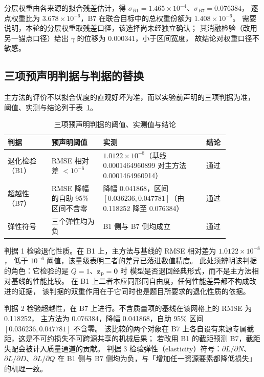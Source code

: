 分层权重由各来源的拟合残差估计，得 $\sigma_{B1}=1.465\times10^{-4}$、$\sigma_{B7}=0.076384$，
逐点权重比为 $3.678\times10^{-6}$，B7 在联合目标中的总权重份额为 $1.408\times10^{-6}$。
需要说明，本轮的分层权重取残差口径，该选择尚未经独立确认；
其消融检验（改用另一锚点口径）给出 $\gamma$ 的位移为 0.000341，小于区间宽度，
故结论对权重口径不敏感。

\subsection{三项预声明判据与判据的替换}
\label{subsec:q2-criteria}

主方法的评价不以拟合优度的直观好坏为准，而以实验前声明的三项判据为准，
阈值、实测与结论列于表~\ref{tab:q2-criteria}。

\begin{table}[H]
  \centering
  \caption{三项预声明判据的阈值、实测值与结论}
  \label{tab:q2-criteria}
  \begin{tabular}{@{}>{\raggedright\arraybackslash}p{0.17\linewidth}>{\raggedright\arraybackslash}p{0.20\linewidth}>{\raggedright\arraybackslash}p{0.40\linewidth}>{\raggedright\arraybackslash}p{0.09\linewidth}@{}}
    \toprule
    判据 & 预声明阈值 & 实测 & 结论 \\
    \midrule
    1 退化检验（B1） & RMSE 相对差 $<10^{-6}$ &
      $1.0122\times10^{-8}$（基线 0.0001464960899 对主方法 0.0001464960914） & 通过 \\
    2 超越性（B7） & RMSE 降幅的自助 95\% 区间不含零 &
      降幅 0.041868，区间 $[0.036236,0.047781]$（由 0.118252 降至 0.076384） & 通过 \\
    3 弹性符号 & 三个弹性均为负 & B1 侧与 B7 侧均成立 & 通过 \\
    \bottomrule
  \end{tabular}
\end{table}

判据 1 检验退化性质。在 B1 上，主方法与基线的 RMSE 相对差为 $1.0122\times10^{-8}$，
低于 $10^{-6}$ 阈值，该量级表明二者的差异已落进数值精度。
此处须辨明该判据的角色：它检验的是 $Q=1$、$\boldsymbol{z}_{\boldsymbol{p}}=\boldsymbol{0}$ 时
模型是否退回经典形式，而不是主方法相对基线的性能比较。
在 B1 上二者本应同形同自由度，任何性能差异都不构成改进的证据，
该判据的双重作用在于它同时也是题目所要求的退化性质的依据。

判据 2 检验超越性，在 B7 上进行。不含质量项的基线在该网格上的 RMSE 为 0.118252，
主方法为 0.076384，降幅 0.041868，自助 95\% 区间 $[0.036236,0.047781]$ 不含零。
该比较的两个对象在 B7 上各自设有来源专属截距，这是不可约损失不可跨源共享的机械后果；
若改用 B1 的截距预测 B7，截距失配会被计入质量通道的贡献。
判据 3 检验弹性（elasticity）符号：$\partial L/\partial N$、$\partial L/\partial D$、$\partial L/\partial Q$
在 B1 侧与 B7 侧均为负，与「增加任一资源要素都降低损失」的机理一致。

